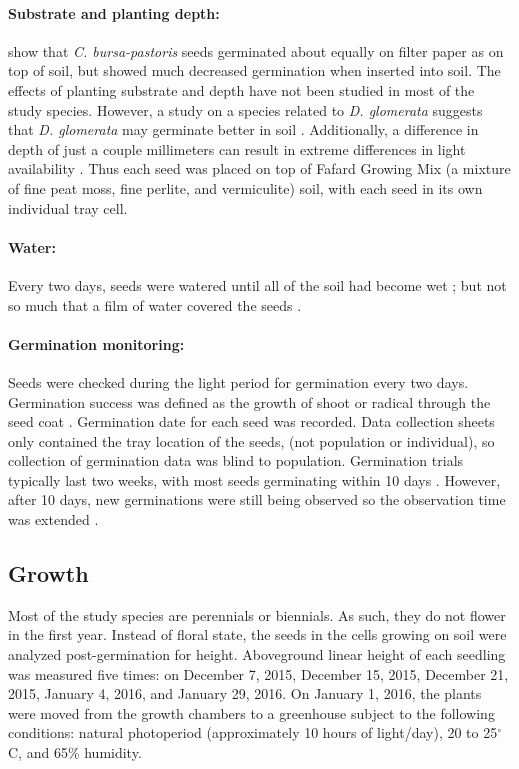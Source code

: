 \documentclass[12pt]{article}\usepackage[]{graphicx}\usepackage[]{color}
\begin{document}
	\paragraph{Substrate and planting depth:} \textcite{Popay1970} show that \textit{C. bursa-pastoris} seeds germinated about equally on filter paper as on top of soil, but showed much decreased germination when inserted into soil. The effects of planting substrate and depth have not been studied in most of the study species. However, a study on a species related to \textit{D. glomerata} suggests that \textit{D. glomerata} may germinate better in soil \parencite{Andrews1974}. Additionally, a difference in depth of just a couple millimeters can result in extreme differences in light availability \parencite{Tester1987}. Thus each seed was placed on top of Fafard Growing Mix (a mixture of fine peat moss, fine perlite, and vermiculite) soil, with each seed in its own individual tray cell.
	
	\paragraph{Water:} Every two days, seeds were watered until all of the soil had become wet \parencite{Steinbauer1957}; but not so much that a film of water covered the seeds \parencite{AOSA1960}.
	
	\paragraph{Germination monitoring:} Seeds were checked during the light period for germination every two days. Germination success was defined as the growth of shoot or radical through the seed coat \parencite{Baskin1998,Popay1970}. Germination date for each seed was recorded. Data collection sheets only contained the tray location of the seeds, (not population or individual), so collection of germination data was blind to population.  Germination trials typically last two weeks, with most seeds germinating within 10 days \parencite{Baskin1998}. However, after 10 days, new germinations were still being observed so the observation time was extended \parencite{Wulff1994}.
	
	\subsection{Growth}
 	Most of the study species are perennials or biennials. As such, they do not flower in the first year. Instead of floral state, the seeds in the cells growing on soil were analyzed post-germination for height. Aboveground linear height of each seedling was measured five times: on December 7, 2015, December 15, 2015, December 21, 2015, January 4, 2016, and January 29, 2016. On January 1, 2016, the plants were moved from the growth chambers to a greenhouse subject to the following conditions: natural photoperiod (approximately 10 hours of light/day), 20 to 25$^\circ$C, and 65\% humidity.  
 	
\end{document}
